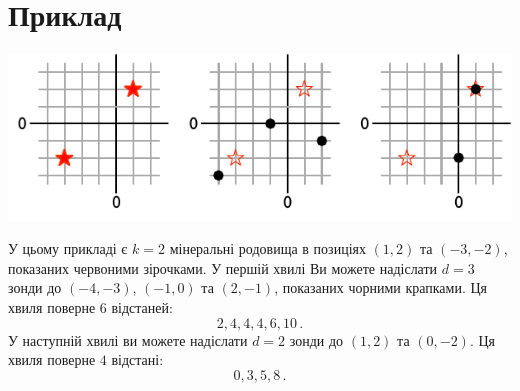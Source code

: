 \section*{Приклад}

\includegraphics[width=.6\textwidth]{img/sample1.pdf}

У цьому прикладі є $k=2$ мінеральні родовища в позиціях $(1,2)$ та $(-3,-2)$, показаних червоними зірочками.
У першій хвилі Ви можете надіслати $d=3$ зонди до $(-4,-3)$, $(-1,0)$ та $(2,-1)$, показаних чорними крапками.
Ця хвиля поверне $6$ відстаней:
\[
  2, 4, 4, 4, 6, 10\,.
\]
У наступній хвилі ви можете надіслати $d=2$ зонди до $(1,2)$ та $(0,-2)$.
Ця хвиля поверне $4$ відстані: \[
  0, 3, 5, 8\,.
\]

